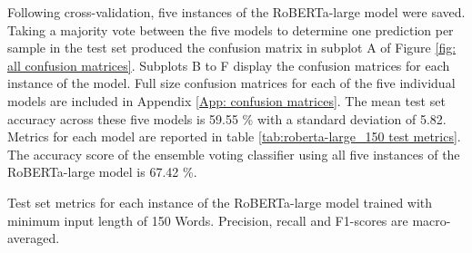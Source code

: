 \documentclass[12pt]{report}
\begin{document}
Following cross-validation, five instances of the RoBERTa-large model were saved.
Taking a majority vote between the five models to determine one prediction per sample in the test set produced the confusion matrix in subplot A of Figure \ref{fig: all confusion matrices}.
Subplots B to F display the confusion matrices for each instance of the model.
Full size confusion matrices for each of the five individual models are included in Appendix \ref{App: confusion matrices}.
The mean test set accuracy across these five models is 59.55 \% with a standard deviation of 5.82.
Metrics for each model are reported in table \ref{tab:roberta-large_150 test metrics}.
The accuracy score of the ensemble voting classifier using all five instances of the RoBERTa-large model is 67.42 \%.

\begin{table}
    \begin{adjustbox}{width=1\textwidth}
        
    \end{adjustbox}
    \caption{Test set metrics for each instance of the RoBERTa-large model trained with minimum input length of 150 Words. Precision, recall and F1-scores are macro-averaged.}
    \label{tab:roberta-large_150 test metrics}
\end{table}
\end{document}

